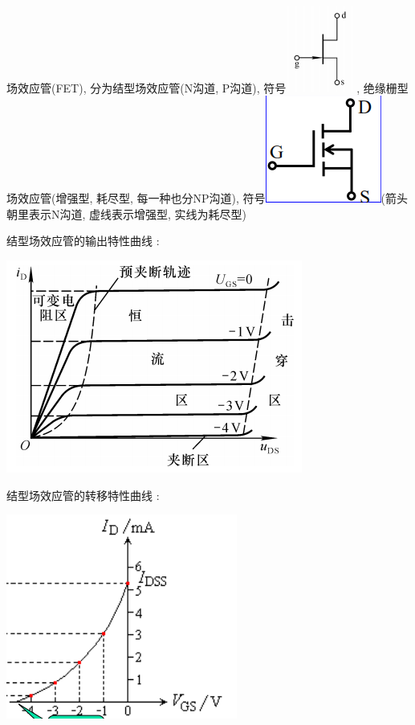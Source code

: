 \documentclass[UTF8, 12pt]{ctexart}
\begin{document}
	~

	\noindent
	场效应管(FET), 分为结型场效应管(N沟道, P沟道), 符号\includegraphics[scale = 0.4]{01/结型场效应管符号.png}, 绝缘栅型场效应管(增强型, 耗尽型, 每一种也分NP沟道), 符号\includegraphics[scale = 0.2]{01/绝缘栅型场效应管符号.png}(箭头朝里表示N沟道, 虚线表示增强型, 实线为耗尽型)

	结型场效应管的输出特性曲线 :

	\includegraphics[scale = 0.4]{01/结型场效应管输出特性曲线.png}

	结型场效应管的转移特性曲线 :

	\includegraphics[]{01/结型场效应管转移特性曲线.png}
\end{document}
